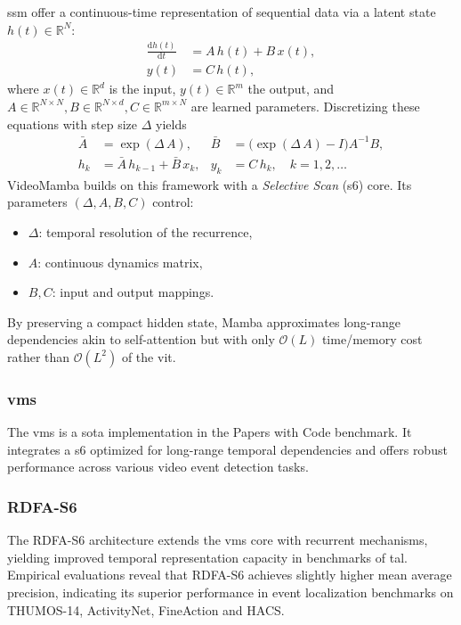 \acrfull{ssm} offer a continuous-time representation of sequential data via a latent state \(h(t)\in\mathbb{R}^N\):
\begin{align}
    \frac{\mathrm{d}h(t)}{\mathrm{d}t} &= A\,h(t) + B\,x(t),  \label{eq:ssm_continuous1}\\
    y(t) &= C\,h(t),                                    \label{eq:ssm_continuous2}
\end{align}
where \(x(t)\in\mathbb{R}^d\) is the input, \(y(t)\in\mathbb{R}^m\) the output, and \(A\in\mathbb{R}^{N\times N}, B\in\mathbb{R}^{N\times d}, C\in\mathbb{R}^{m\times N}\) are learned parameters.  Discretizing these equations with step size \(\Delta\) yields
\begin{align}
    \bar A &= \exp(\Delta\,A), 
    & 
    \bar B &= \bigl(\exp(\Delta\,A)-I\bigr)A^{-1}B,\\
    h_k &= \bar A\,h_{k-1} + \bar B\,x_k, 
    &
    y_k &= C\,h_k,
    \quad k=1,2,\dots
\end{align}
VideoMamba \cite{li_videomamba_2024} builds on this framework with a \emph{Selective Scan} (\acrshort{s6}) core.  Its parameters \((\Delta, A,B,C)\) control:
\begin{itemize}
    \item \(\Delta\): temporal resolution of the recurrence,
    \item \(A\): continuous dynamics matrix,
    \item \(B,C\): input and output mappings.
\end{itemize}

By preserving a compact hidden state, Mamba approximates long-range dependencies akin to self-attention but with only \(\mathcal{O}(L)\) time/memory cost rather than \(\mathcal{O}(L^2)\) of the \acrlong{vit}.  

\subsubsection{\acrfull{vms}}
The \acrfull{vms} is a \acrfull{sota} implementation in the Papers with Code benchmark. It integrates a \acrlong{s6} optimized for long-range temporal dependencies and offers robust performance across various video event detection tasks. 

\subsubsection{RDFA-S6}
The RDFA-S6 architecture extends the \acrshort{vms} core with recurrent mechanisms, yielding improved temporal representation capacity in benchmarks of \acrfull{tal}. Empirical evaluations reveal that RDFA-S6 achieves slightly higher mean average precision, indicating its superior performance in event localization benchmarks on THUMOS-14, ActivityNet, FineAction and HACS.


